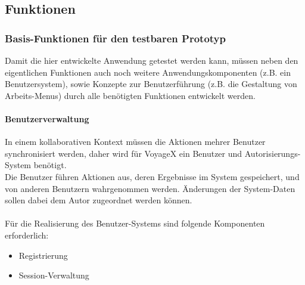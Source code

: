 \subsection{Funktionen}\label{4_FUNC}

\subsubsection{Basis-Funktionen für den testbaren Prototyp}\label{4_BASEFUNC}
Damit die hier entwickelte Anwendung getestet werden kann, müssen neben den eigentlichen Funktionen auch noch weitere Anwendungskomponenten (z.B. ein Benutzersystem), sowie Konzepte zur Benutzerführung (z.B. die Gestaltung von Arbeits-Menus) durch alle benötigten Funktionen entwickelt werden.

\paragraph{Benutzerverwaltung}
In einem kollaborativen Kontext müssen die Aktionen mehrer Benutzer synchronisiert werden, daher wird für VoyageX ein Benutzer und Autorisierungs-System benötigt.\\
Die Benutzer führen Aktionen aus, deren Ergebnisse im System gespeichert, und von anderen Benutzern wahrgenommen werden. Änderungen der System-Daten sollen dabei dem Autor zugeordnet werden können.\\ \\
Für die Realisierung des Benutzer-Systems sind folgende Komponenten erforderlich:
\begin{itemize}
  \item Registrierung
  \item Session-Verwaltung
\end{itemize}

